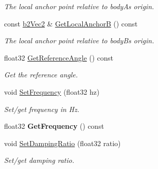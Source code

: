\begin{DoxyCompactItemize}
\begin{DoxyCompactList}\small\item\em The local anchor point relative to bodyA\textquotesingle{}s origin. \end{DoxyCompactList}\item 
\mbox{\label{classb2WeldJoint_ac0c5e6a53b120f0302d2c6d267d40147}} 
const \hyperlink{structb2Vec2}{b2\+Vec2} \& \hyperlink{classb2WeldJoint_ac0c5e6a53b120f0302d2c6d267d40147}{Get\+Local\+AnchorB} () const
\begin{DoxyCompactList}\small\item\em The local anchor point relative to bodyB\textquotesingle{}s origin. \end{DoxyCompactList}\item 
\mbox{\label{classb2WeldJoint_a2be9f207be5b00b775a7576e16d442ef}} 
float32 \hyperlink{classb2WeldJoint_a2be9f207be5b00b775a7576e16d442ef}{Get\+Reference\+Angle} () const
\begin{DoxyCompactList}\small\item\em Get the reference angle. \end{DoxyCompactList}\item 
\mbox{\label{classb2WeldJoint_a0796404379b7562f1af557729085c447}} 
void \hyperlink{classb2WeldJoint_a0796404379b7562f1af557729085c447}{Set\+Frequency} (float32 hz)
\begin{DoxyCompactList}\small\item\em Set/get frequency in Hz. \end{DoxyCompactList}\item 
\mbox{\label{classb2WeldJoint_a36bf80c1c59e28976e286d9ed750b0df}} 
float32 {\bfseries Get\+Frequency} () const
\item 
\mbox{\label{classb2WeldJoint_aea79865e590edba09eff9d2243689967}} 
void \hyperlink{classb2WeldJoint_aea79865e590edba09eff9d2243689967}{Set\+Damping\+Ratio} (float32 ratio)
\begin{DoxyCompactList}\small\item\em Set/get damping ratio. \end{DoxyCompactList}\item 
\mbox{\label{classb2WeldJoint_a603d83491d474156b2c09b59a23bfca4}} 

\end{DoxyCompactItemize}
